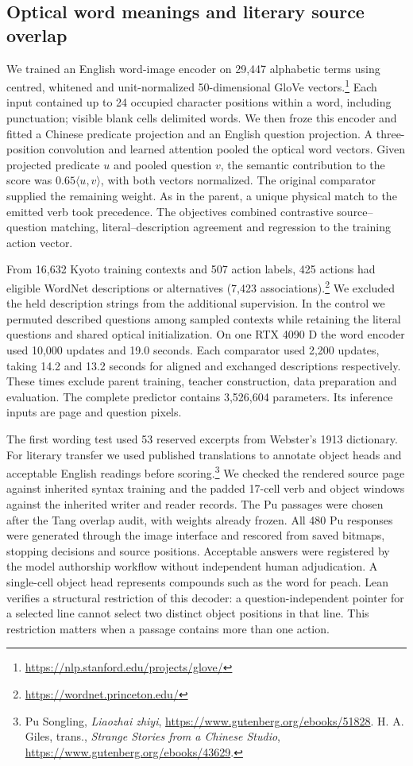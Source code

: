 \subsection*{Optical word meanings and literary source overlap}
We trained an English word-image encoder on 29,447 alphabetic terms using centred, whitened and unit-normalized 50-dimensional GloVe vectors.\footnote{\url{https://nlp.stanford.edu/projects/glove/}} Each input contained up to 24 occupied character positions within a word, including punctuation; visible blank cells delimited words. We then froze this encoder and fitted a Chinese predicate projection and an English question projection. A three-position convolution and learned attention pooled the optical word vectors. Given projected predicate $u$ and pooled question $v$, the semantic contribution to the score was $0.65\langle u,v\rangle$, with both vectors normalized. The original comparator supplied the remaining weight. As in the parent, a unique physical match to the emitted verb took precedence. The objectives combined contrastive source--question matching, literal--description agreement and regression to the training action vector.

From 16,632 Kyoto training contexts and 507 action labels, 425 actions had eligible WordNet descriptions or alternatives (7,423 associations).\footnote{\url{https://wordnet.princeton.edu/}} We excluded the held description strings from the additional supervision. In the control we permuted described questions among sampled contexts while retaining the literal questions and shared optical initialization. On one RTX 4090 D the word encoder used 10,000 updates and 19.0 seconds. Each comparator used 2,200 updates, taking 14.2 and 13.2 seconds for aligned and exchanged descriptions respectively. These times exclude parent training, teacher construction, data preparation and evaluation. The complete predictor contains 3,526,604 parameters. Its inference inputs are page and question pixels.

The first wording test used 53 reserved excerpts from Webster's 1913 dictionary. For literary transfer we used published translations to annotate object heads and acceptable English readings before scoring.\footnote{Pu Songling, \textit{Liaozhai zhiyi}, \url{https://www.gutenberg.org/ebooks/51828}. H. A. Giles, trans., \textit{Strange Stories from a Chinese Studio}, \url{https://www.gutenberg.org/ebooks/43629}.} We checked the rendered source page against inherited syntax training and the padded 17-cell verb and object windows against the inherited writer and reader records. The Pu passages were chosen after the Tang overlap audit, with weights already frozen. All 480 Pu responses were generated through the image interface and rescored from saved bitmaps, stopping decisions and source positions. Acceptable answers were registered by the model authorship workflow without independent human adjudication. A single-cell object head represents compounds such as the word for peach. Lean verifies a structural restriction of this decoder: a question-independent pointer for a selected line cannot select two distinct object positions in that line. This restriction matters when a passage contains more than one action.
